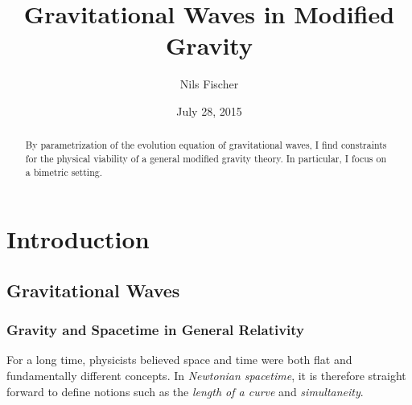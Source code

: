 \documentclass[parskip=half]{scrreprt}
\title{Gravitational Waves in Modified Gravity}
\author{Nils Fischer}
\date{July 28, 2015}
\begin{document}


\begin{abstract}
	By parametrization of the evolution equation of gravitational waves, I find constraints for the physical viability of a general modified gravity theory. In particular, I focus on a bimetric setting.
\end{abstract}


\tableofcontents


\chapter{Introduction}\label{ch:intro}



\section{Gravitational Waves}\label{sec:grav_waves}


\subsection{Gravity and Spacetime in General Relativity}\label{sec:gr}

For a long time, physicists believed space and time were both flat and fundamentally different concepts. In \emph{Newtonian spacetime}, it is therefore straight forward to define notions such as the \emph{length of a curve} and \emph{simultaneity}. 
\end{document}
